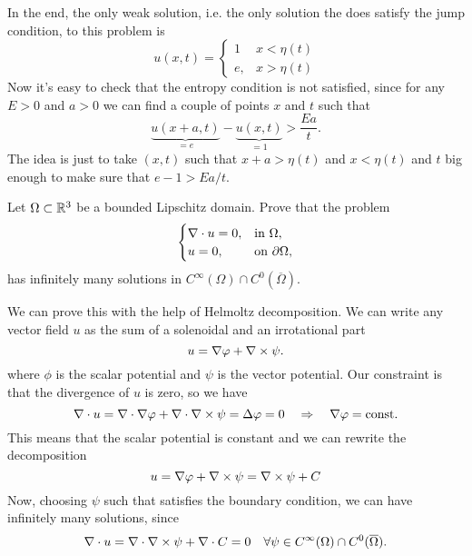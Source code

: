 \begin{itemize}
\begin{center}
          \end{center}
          In the end, the only weak solution, i.e. the only solution the does satisfy the jump condition,
          to this problem is
          \[
              u(x,t) = \begin{cases}
                  1  & x < \eta(t) \\
                  e, & x > \eta(t)
              \end{cases}
          \]
          Now it's easy to check that the entropy condition is not satisfied, since for
          any \(E>0\) and \(a > 0\) we can find a couple of points \(x\) and \(t\) such
          that
          \[
              \underbrace{u(x+a,t)}_{=e} - \underbrace{u(x,t)}_{=1} > \frac{Ea}{t}.
          \]
          The idea is just to take \((x, t)\) such that \(x + a > \eta(t)\) and \(x <
          \eta(t)\) and \(t\) big enough to make sure that $e-1>Ea/t$.
\end{itemize}

\newpage
\begin{exercise}
    Let \(\Omega \subset \mathbb{R}^3\) be a bounded Lipschitz domain. Prove that the problem
    \begin{equation*}
        \begin{cases}
            \nabla \cdot u = 0, & \text{in } \Omega,          \\
            u  = 0,            & \text{on } \partial \Omega,
        \end{cases}
    \end{equation*}
    has infinitely many solutions in \(C^\infty(\Omega) \cap C^0(\overline{\Omega})\).
\end{exercise}
We can prove this with the help of Helmoltz decomposition. We can write any vector field \(u\) as the sum of a solenoidal and an irrotational part
\[
    u = \nabla \varphi + \nabla \times \psi.
\]
where \(\phi\) is the scalar potential and \(\psi\) is the vector potential.
Our constraint is that the divergence of \(u\) is zero, so we have
\[
    \nabla \cdot u = \nabla \cdot \nabla \varphi + \nabla \cdot \nabla \times \psi = \Delta \varphi = 0 \quad \Rightarrow \quad \nabla \varphi = \text{const.}
\]
This means that the scalar potential is constant and we can rewrite the
decomposition
\[
    u = \nabla \varphi + \nabla \times \psi = \nabla \times \psi + C
\]
Now, choosing \(\psi\) such that satisfies the boundary condition, we can have
infinitely many solutions, since
\[
    \nabla \cdot u = \nabla \cdot \nabla \times \psi + \nabla \cdot C = 0 \quad \forall \psi \in  C^\infty(\Omega) \cap C^0(\overline{\Omega}).
\]

